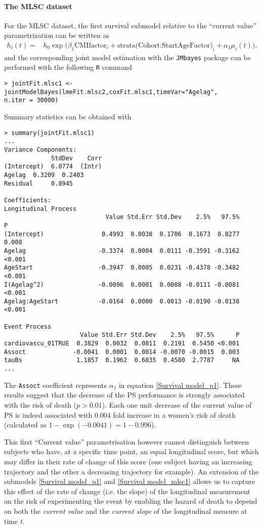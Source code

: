 \documentclass[12pt]{article}
\begin{document}
\paragraph{The MLSC dataset}
For the MLSC dataset, the first survival submodel relative to the ``current value'' parametrization can be written as 
\begin{equation}
\begin{split}
h_i(t) = &h_0 \exp \big(\beta_1 \text{CMIfactor}_i + \text{strata(Cohort:StartAgeFactor)}_i  + \alpha_1 \mu_i(t)\big),
\end{split}
\label{Survival model_mlsc1}
\end{equation}
and the corresponding joint model estimation with the \texttt{JMbayes} package can be performed with the following \texttt{R} command
\begin{verbatim}
> jointFit.mlsc1 <-jointModelBayes(lmeFit.mlsc2,coxFit.mlsc1,timeVar="Agelag",
n.iter = 30000) 
\end{verbatim}
Summary statistics can be obtained with 
\begin{verbatim}
> summary(jointFit.mlsc1)
...
Variance Components:
             StdDev    Corr
(Intercept)  6.0774  (Intr)
Agelag  0.3209  0.2403
Residual     0.8945        

Coefficients:
Longitudinal Process
                            Value Std.Err Std.Dev    2.5%   97.5%      P
(Intercept)                0.4993  0.0038  0.1706  0.1673  0.8277  0.008
Agelag                    -0.3374  0.0004  0.0111 -0.3591 -0.3162 <0.001
AgeStart                  -0.3947  0.0005  0.0231 -0.4378 -0.3482 <0.001
I(Agelag^2)               -0.0096  0.0001  0.0008 -0.0111 -0.0081 <0.001
Agelag:AgeStart           -0.0164  0.0000  0.0013 -0.0190 -0.0138 <0.001

Event Process
                     Value Std.Err Std.Dev    2.5%   97.5%      P
cardiovascu_01TRUE  0.3829  0.0032  0.0811  0.2191  0.5450 <0.001
Assoct             -0.0041  0.0001  0.0014 -0.0070 -0.0015  0.003
tauBs               1.1857  0.1962  0.6035  0.4580  2.7787     NA
...
\end{verbatim}
The \texttt{Assoct} coefficient represents $\alpha_1$ in equation \eqref{Survival model_p1}. These results suggest that the decrease of the PS performance is strongly associated with the risk of death ($p>0.01$). Each one unit decrease of the current value of PS is indeed associated with $0.004$ fold increase in a women's risk of death (calculated as $1-\exp (-0.0041)=1-0.996$).

This first ``Current value'' parametrisation however cannot distinguish between subjects who have, at a specific time point, an equal longitudinal score, but which may differ in their rate of change of this score (one subject having an increasing trajectory and the other a decreasing trajectory for example).
An extension of the submodels \eqref{Survival model_p1} and \eqref{Survival model_mlsc1} allows us to capture this effect of the rate of change (i.e. the slope) of the longitudinal measurement on the risk of experimenting the event by enabling the hazard of death to depend on both the \textit{current value} and the \textit{current slope} of the longitudinal measure at time $t$.
\end{document}
